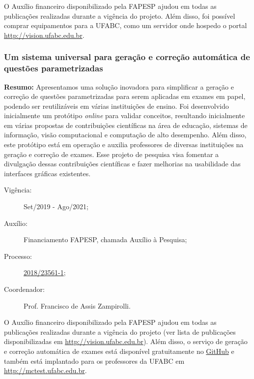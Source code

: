 O Auxílio financeiro disponibilizado pela FAPESP ajudou em todas as publicações realizadas durante a vigência do projeto. Além disso, foi possível comprar equipamentos para a UFABC, como um servidor onde hospedo o portal \url{http://vision.ufabc.edu.br}. 

\subsubsection{Um sistema universal para geração e correção automática de questões parametrizadas}

\noindent\textbf{Resumo:} Apresentamos uma solução inovadora para simplificar a geração e correção de questões parametrizadas para serem aplicadas em exames em papel, podendo ser reutilizáveis em várias instituições de ensino. Foi desenvolvido inicialmente um protótipo \textit{online} para validar conceitos, resultando inicialmente em várias propostas de contribuições científicas na área de educação, sistemas de informação, visão computacional e computação de alto desempenho. Além disso, este protótipo está em operação e auxilia professores de diversas instituições na geração e correção de exames. Esse projeto de pesquisa visa fomentar a divulgação dessas contribuições científicas e fazer melhorias na usabilidade das interfaces gráficas existentes.

\begin{description}
    \item[Vigência:] Set/2019 - Ago/2021;
    \item[Auxílio:] Financiamento FAPESP, chamada Auxílio à Pesquisa;
    \item[Processo:] \href{https://bv.fapesp.br/pt/auxilios/105047/um-sistema-universal-para-geracao-e-correcao-automatica-de-questoes-parametrizadas/}{2018/23561-1};
    \item[Coordenador:] Prof. Francisco de Assis Zampirolli.
\end{description}

O Auxílio financeiro disponibilizado pela FAPESP ajudou em todas as publicações realizadas durante a vigência do projeto (ver lista de publicações disponibilizadas em \url{http://vision.ufabc.edu.br}). Além disso, o serviço de geração e correção automática de exames está disponível gratuitamente no \href{https://github.com/fZampirolli/mctest}{GitHub} e também está implantado para os professores da UFABC em \url{http://mctest.ufabc.edu.br}. 

